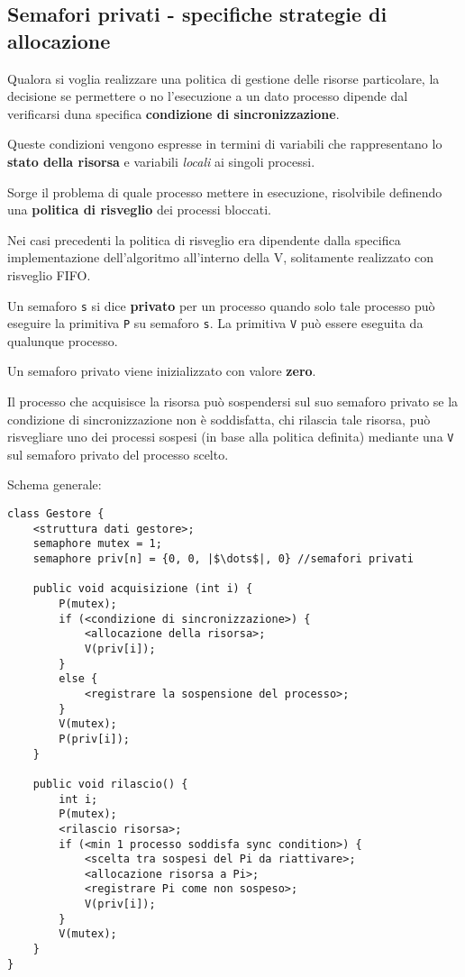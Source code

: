 \subsection{Semafori privati - specifiche strategie di allocazione}
Qualora si voglia realizzare una politica di gestione delle risorse particolare, la decisione se permettere o no l'esecuzione a un dato processo dipende dal verificarsi duna specifica \textbf{condizione di sincronizzazione}.

Queste condizioni vengono espresse in termini di variabili che rappresentano lo \textbf{stato della risorsa} e variabili \textit{locali} ai singoli processi.

Sorge il problema di quale processo mettere in esecuzione, risolvibile definendo una \textbf{politica di risveglio} dei processi bloccati.

Nei casi precedenti la politica di risveglio era dipendente dalla specifica implementazione dell'algoritmo all'interno della V, solitamente realizzato con risveglio FIFO.

\begin{mdframed}[topline=false,bottomline=false,rightline=false]
    Un semaforo \texttt{s} si dice \textbf{privato} per un processo quando solo tale processo può eseguire la primitiva \texttt{P} su semaforo \texttt{s}. La primitiva \texttt{V} può essere eseguita da qualunque processo.
\end{mdframed}

Un semaforo privato viene inizializzato con valore \textbf{zero}.

Il processo che acquisisce la risorsa può sospendersi sul suo semaforo privato se la condizione di sincronizzazione non è soddisfatta, chi rilascia tale risorsa, può risvegliare uno dei processi sospesi (in base alla politica definita) mediante una \texttt{V} sul semaforo privato del processo scelto.

Schema generale:

\begin{verbatim}
class Gestore {
    <struttura dati gestore>;
    semaphore mutex = 1;
    semaphore priv[n] = {0, 0, |$\dots$|, 0} //semafori privati

    public void acquisizione (int i) {
        P(mutex);
        if (<condizione di sincronizzazione>) {
            <allocazione della risorsa>;
            V(priv[i]);
        }
        else {
            <registrare la sospensione del processo>;
        }
        V(mutex);
        P(priv[i]);
    }

    public void rilascio() {
        int i;
        P(mutex);
        <rilascio risorsa>;
        if (<min 1 processo soddisfa sync condition>) {
            <scelta tra sospesi del Pi da riattivare>;
            <allocazione risorsa a Pi>;
            <registrare Pi come non sospeso>;
            V(priv[i]);
        }
        V(mutex);
    }
}
\end{verbatim}

